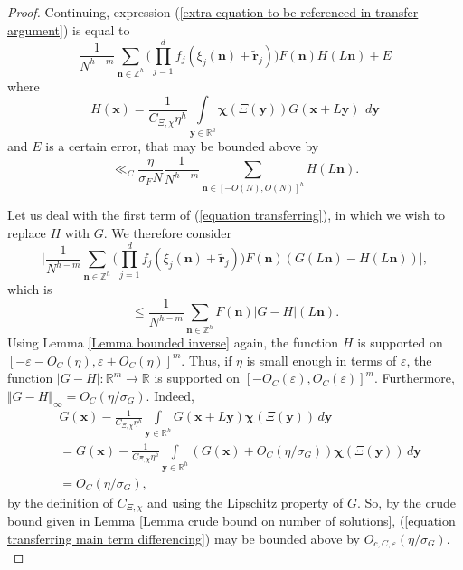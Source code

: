 \documentclass[12pt,a4paper,twoside,reqno]{amsart}
\numberwithin{equation}{section}
\begin{document}
\begin{proof}
 Continuing, expression (\ref{extra equation to be referenced in transfer argument}) is equal to 
\begin{equation}
\label{equation transferring}
\frac{1}{N^{h-m}} \sum\limits_{\mathbf{n}\in\mathbb{Z}^h}\Big(\prod\limits_{j=1}^d f_j(\xi_j(\mathbf{n}) + \widetilde{\mathbf{r}}_j)\Big) F(\mathbf{n}) H(L\mathbf{n} ) + E
\end{equation}
\noindent where \[H(\mathbf{x}) = \frac{1}{C_{\Xi,\chi}\eta^h}\int\limits_{\mathbf{y}\in\mathbb{R}^h}  \boldsymbol{\chi}(\Xi(\mathbf{y}))G(\mathbf{x} + L\mathbf{y})\ \, d\mathbf{y}\] and $E$ is a certain error, that may be bounded above by 
\begin{equation}
\label{transfer error bounded above}
\ll_C \frac{\eta}{\sigma_F N} \frac{1}{N^{h-m}} \sum\limits_{\mathbf{n}\in[-O(N),O(N)]^h}H(L\mathbf{n}).
\end{equation}  

Let us deal with the first term of (\ref{equation transferring}), in which we wish to replace $H$ with $G$. We therefore consider
\begin{equation*}
\Big\vert\frac{1}{N^{h-m}} \sum\limits_{\mathbf{n}\in\mathbb{Z}^h}\Big(\prod\limits_{j=1}^d f_j(\xi_j(\mathbf{n}) + \widetilde{\mathbf{r}}_j)\Big) F(\mathbf{n}) (G(L\mathbf{n}) - H(L\mathbf{n})) \Big\vert,
\end{equation*}
which is
\begin{equation}
\label{equation transferring main term differencing}
\leqslant \frac{1}{N^{h-m}} \sum\limits_{\mathbf{n}\in\mathbb{Z}^h}F(\mathbf{n}) \vert G-H\vert(L\mathbf{n}).
\end{equation} Using Lemma \ref{Lemma bounded inverse} again, the function $H$ is supported on $[-\varepsilon - O_C(\eta), \varepsilon + O_C(\eta)]^m$. Thus, if $\eta$ is small enough in terms of $\varepsilon$, the function $\vert G-H\vert:\mathbb{R}^m\longrightarrow \mathbb{R}$ is supported on $[-O_C(\varepsilon), O_C(\varepsilon)]^m$. Furthermore, $\Vert G - H\Vert_\infty = O_C(\eta/\sigma_G)$. Indeed, 
\begin{align*}
&G(\mathbf{x}) - \frac{1}{C_{\Xi,\chi}\eta^h}\int\limits_{\mathbf{y}\in\mathbb{R}^h} G(\mathbf{x}+ L\mathbf{y}) \boldsymbol{\chi}(\Xi(\mathbf{y})) \, d\mathbf{y} \\
&= G(\mathbf{x}) - \frac{1}{C_{\Xi,\chi}\eta^h} \int\limits_{\mathbf{y} \in\mathbb{R}^h} (G(\mathbf{x}) + O_C(\eta/\sigma_G))\boldsymbol{\chi}(\Xi(\mathbf{y})) \, d\mathbf{y}\\
& = O_C(\eta/\sigma_G),\nonumber
\end{align*}
\noindent by the definition of $C_{\Xi,\chi}$ and using the Lipschitz property of $G$. So, by the crude bound given in Lemma \ref{Lemma crude bound on number of solutions}, (\ref{equation transferring main term differencing}) may be bounded above by $O_{c,C,\varepsilon}(\eta/\sigma_G)$. \\ 



\end{proof}
\end{document}

